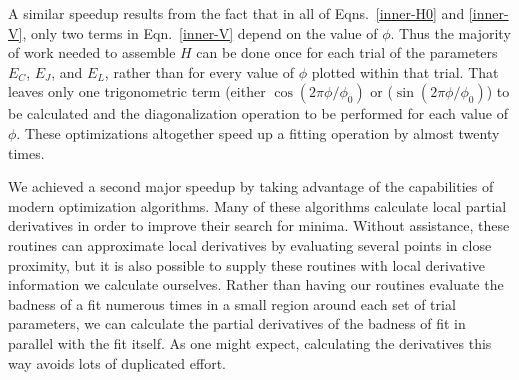 \documentclass[twocolumn]{revtex4}
\begin{document}
A similar speedup results from the fact that in all of
Eqns.~\ref{inner-H0} and \ref{inner-V}, only two terms in
Eqn.~\eqref{inner-V} depend on the value of $\phi$. Thus the majority of
work needed to assemble $H$ can be done once for each trial of the
parameters $E_C$, $E_J$, and $E_L$, rather than for every value of
$\phi$ plotted within that trial. That leaves only one trigonometric
term (either $\cos\left(2\pi\phi/\phi_0\right)$ or
($\sin\left(2\pi\phi/\phi_0\right)$) to be calculated and the
diagonalization operation to be performed for each value of
$\phi$. These optimizations altogether speed up a fitting operation by
almost twenty times.

We achieved a second major speedup by taking advantage of the
capabilities of modern optimization algorithms.\cite{Byrd}\cite{Zhu}
Many of these algorithms calculate local partial derivatives in order
to improve their search for minima. Without assistance, these routines
can approximate local derivatives by evaluating several points in
close proximity, but it is also possible to supply these routines with
local derivative information we calculate ourselves. Rather than
having our routines evaluate the badness of a fit numerous times in a
small region around each set of trial parameters, we can calculate the
partial derivatives of the badness of fit in parallel with the fit
itself. As one might expect, calculating the derivatives this way
avoids lots of duplicated effort.
\end{document}
